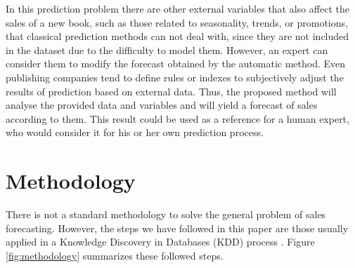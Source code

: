\documentclass[a4paper,10pt,twocolumn,preprint,3p]{elsarticle}
\begin{document}
In this prediction problem there are other external variables that also affect 
the sales of a new book, such as those related to seasonality, trends, or 
promotions, that classical prediction methods can not deal with, since they are not included in the dataset due to the difficulty to model them. %
However, an expert can consider them to modify the forecast obtained by 
the automatic method. Even publishing companies tend to define rules or 
indexes to subjectively adjust the results of prediction based on
external data. 
Thus, the proposed method will analyse the provided data and
variables and will yield a forecast of sales according to them. This
result could be used as a reference for a human expert, who would
consider it for his or her own prediction process. 




\section{Methodology}
\label{sec:methodology}

There is not a standard methodology to solve the general problem of sales forecasting. However, the steps we have followed in this paper are those usually applied in a Knowledge Discovery in Databases (KDD) process \cite{fayyad1996data}. Figure \ref{fig:methodology} summarizes these followed steps.
\end{document}
